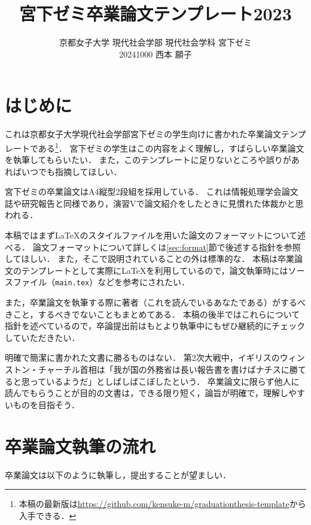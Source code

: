 \documentclass[a4paper,twocolumn,10pt]{ltjsarticle}
\title{宮下ゼミ卒業論文テンプレート2023}
\author{京都女子大学 現代社会学部 現代社会学科 宮下ゼミ\\
20241000 西本 願子}
\begin{document}
\maketitle

\section{はじめに}

これは京都女子大学現代社会学部宮下ゼミの学生向けに書かれた卒業論文テンプレートである\footnote{本稿の最新版は\url{https://github.com/kensuke-m/graduationthesis-template}から入手できる．}．
宮下ゼミの学生はこの内容をよく理解し，すばらしい卒業論文を執筆してもらいたい．
また，このテンプレートに足りないところや誤りがあればいつでも指摘してほしい．

宮下ゼミの卒業論文はA4縦型2段組を採用している．
これは情報処理学会論文誌や研究報告と同様であり，演習Vで論文紹介をしたときに見慣れた体裁かと思われる．

本稿ではまず\LaTeX のスタイルファイルを用いた論文のフォーマットについて述べる．
論文フォーマットについて詳しくは\ref{sec:format}節で後述する指針を参照してほしい．
また，そこで説明されていることの外は標準的な．
本稿は卒業論文のテンプレートとして実際に\LaTeX を利用しているので，論文執筆時にはソースファイル（{\tt main.tex}）などを参考にされたい．

また，卒業論文を執筆する際に著者（これを読んでいるあなたである）がするべきこと，するべきでないこともまとめてある．
本稿の後半ではこれらについて指針を述べているので，卒論提出前はもとより執筆中にもぜひ継続的にチェックしていただきたい．

明確で簡潔に書かれた文書に勝るものはない．
第2次大戦中，イギリスのウィンストン・チャーチル首相は「我が国の外務省は長い報告書を書けばナチスに勝てると思っているようだ」としばしばこぼしたという\cite{newsweek}．
卒業論文に限らず他人に読んでもらうことが目的の文書は，できる限り短く，論旨が明確で，理解しやすいものを目指そう．

\section{卒業論文執筆の流れ}

卒業論文は以下のように執筆し，提出することが望ましい．
\end{document}
